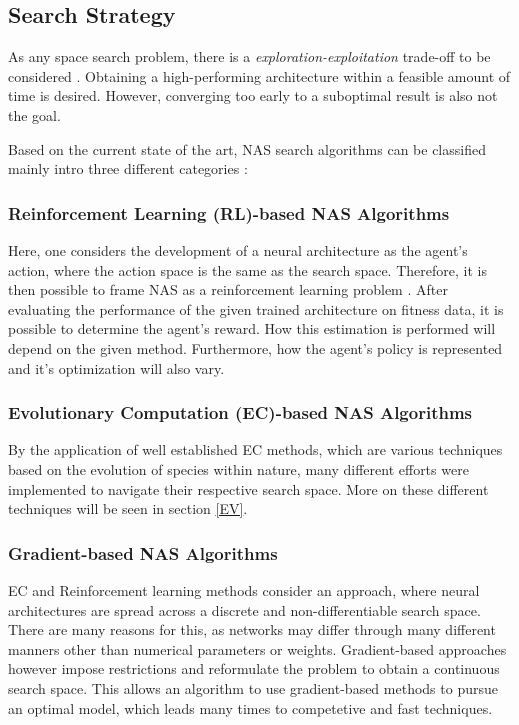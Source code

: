 \documentclass[10pt,        %
               a4paper,     %
               journal,     %
               ]{IEEEtran}
\begin{document}
\subsection{Search Strategy}
As any space search problem, there is a \textit{exploration-exploitation} trade-off to be considered \cite{elsken2019neural}.
Obtaining a high-performing architecture within a feasible amount of time is desired. However, converging too early to a
suboptimal result is also not the goal.

Based on the current state of the art, NAS search algorithms can be classified mainly intro three different
categories \cite{liu2021survey}:

\subsubsection{\textbf{Reinforcement Learning} (RL)-based NAS Algorithms}
Here, one considers the development of a neural architecture as the agent's action, where the action space is the same as
the search space. Therefore, it is then possible to frame NAS as a reinforcement learning problem \cite{elsken2019neural}.
After evaluating the performance of the given trained architecture on fitness data, it is possible to
determine the agent's reward. How this estimation is performed will depend on the given method. Furthermore,
how the agent's policy is represented and it's optimization will also vary.

\subsubsection{\textbf{Evolutionary Computation} (EC)-based NAS Algorithms}
By the application of well established EC methods, which are various techniques based on the evolution of
species within nature, many different efforts were implemented to navigate their respective search space.
More on these different techniques will be seen in section \ref{EV}.


\subsubsection{\textbf{Gradient}-based NAS Algorithms}
EC and Reinforcement learning methods consider an approach, where neural architectures
are spread across a discrete and non-differentiable search space. There are many reasons for this, as networks may differ
through many different manners other than numerical parameters or weights. Gradient-based approaches however
impose restrictions and reformulate the problem to obtain a continuous search space. This allows an algorithm
to use gradient-based methods to pursue an optimal model, which leads many times to competetive and fast techniques.
\end{document}
